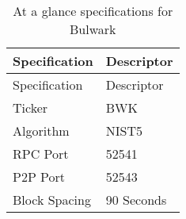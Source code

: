 \documentclass[11pt,a4paperpaper,]{report}
\begin{document}
\begin{longtable}[c]{@{}ll@{}}
\caption{At a glance specifications for Bulwark
\label{ref_a_table}}\tabularnewline
\toprule
\begin{minipage}[b]{0.35\columnwidth}\raggedright\strut
Specification
\strut\end{minipage} &
\begin{minipage}[b]{0.59\columnwidth}\raggedright\strut
Descriptor
\strut\end{minipage}\tabularnewline
\midrule
\endfirsthead
\toprule
\begin{minipage}[b]{0.35\columnwidth}\raggedright\strut
Specification
\strut\end{minipage} &
\begin{minipage}[b]{0.59\columnwidth}\raggedright\strut
Descriptor
\strut\end{minipage}\tabularnewline
\midrule
\endhead
\begin{minipage}[t]{0.35\columnwidth}\raggedright\strut
Ticker
\strut\end{minipage} &
\begin{minipage}[t]{0.59\columnwidth}\raggedright\strut
BWK
\strut\end{minipage}\tabularnewline
\begin{minipage}[t]{0.35\columnwidth}\raggedright\strut
Algorithm
\strut\end{minipage} &
\begin{minipage}[t]{0.59\columnwidth}\raggedright\strut
NIST5
\strut\end{minipage}\tabularnewline
\begin{minipage}[t]{0.35\columnwidth}\raggedright\strut
RPC Port
\strut\end{minipage} &
\begin{minipage}[t]{0.59\columnwidth}\raggedright\strut
52541
\strut\end{minipage}\tabularnewline
\begin{minipage}[t]{0.35\columnwidth}\raggedright\strut
P2P Port
\strut\end{minipage} &
\begin{minipage}[t]{0.59\columnwidth}\raggedright\strut
52543
\strut\end{minipage}\tabularnewline
\begin{minipage}[t]{0.35\columnwidth}\raggedright\strut
Block Spacing
\strut\end{minipage} &
\begin{minipage}[t]{0.59\columnwidth}\raggedright\strut
90 Seconds
\strut\end{minipage}\tabularnewline

\end{longtable}
\end{document}
